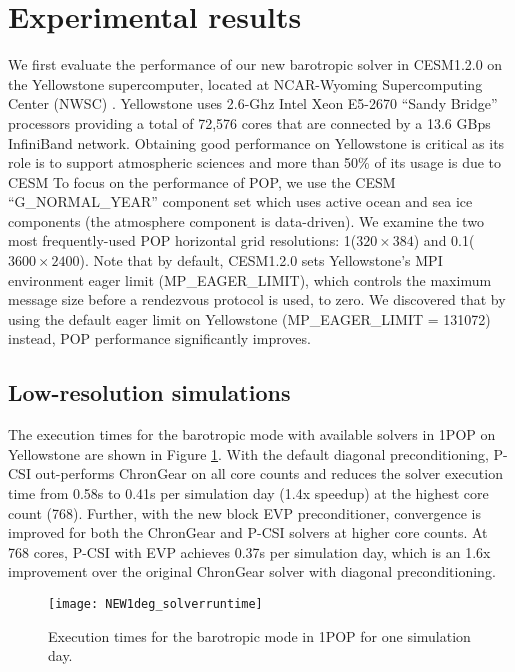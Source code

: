 \section{Experimental results} \label{se:exp}

We first evaluate the performance of our new barotropic solver in
CESM1.2.0 on the Yellowstone supercomputer, located at NCAR-Wyoming
Supercomputing Center (NWSC) \cite{loft:2015}. Yellowstone uses 
2.6-Ghz Intel Xeon E5-2670 ``Sandy Bridge'' processors providing a total of  72,576 cores that are connected
by a 13.6 GBps InfiniBand network.  Obtaining good performance on
Yellowstone is critical as its role is to support atmospheric sciences
and more than 50\% of its usage is due to CESM \cite{wf2014}
To focus on the performance of POP, we use the CESM
``G\_NORMAL\_YEAR'' component set which uses active ocean and sea
ice components (the atmosphere component is data-driven). 
We examine  the two most frequently-used POP horizontal grid resolutions: 
1\degree\space ($320\times 384$) and 0.1\degree\space ($3600\times 2400$).
Note that by default, CESM1.2.0 sets Yellowstone's MPI environment
eager limit (MP\_EAGER\_LIMIT), which controls the maximum message size before a rendezvous protocol is used,
to zero.  We discovered that by using the default eager limit on
Yellowstone (MP\_EAGER\_LIMIT = 131072) instead, POP performance significantly improves.


\subsection{Low-resolution simulations}
The execution times for the barotropic mode with available solvers in 1\degree\space POP on
Yellowstone are shown in Figure \ref{fig:runtime1}.  With the default
diagonal preconditioning, P-CSI out-performs ChronGear on all core
counts and reduces the solver execution time from 0.58s to 0.41s per
simulation day (1.4x speedup) at the highest core count (768).
Further, with the new
block EVP preconditioner, convergence is improved for both the ChronGear
and P-CSI solvers at higher core counts.  At 768 cores, P-CSI with EVP achieves 0.37s per simulation
day, which is an 1.6x improvement over the original ChronGear solver
with diagonal preconditioning.
\begin {figure}[!t]
\centering
\texttt{[image: NEW1deg\_solverruntime]}
\vspace{-.25in}
\caption []{Execution times for the barotropic mode in 1\degree\space POP
  for one simulation day.\label {fig:runtime1}}
\vspace{-.1in}
\end {figure}

